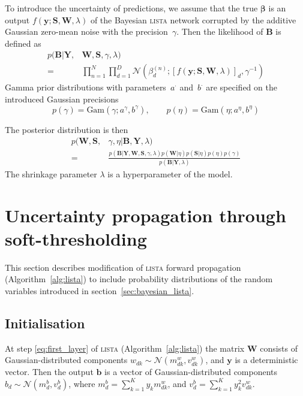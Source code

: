 \documentclass{article}
\begin{document}
  To introduce the uncertainty of predictions, we assume that the true $\boldsymbol\beta$ is an output $f(\mathbf{y} ; \mathbf{S}, \mathbf{W}, \lambda)$ of the Bayesian \textsc{lista} network corrupted by the additive Gaussian zero-mean noise with the precision~$\gamma$. Then the likelihood of $\mathbf{B}$ is defined as
  \begin{equation}
  \label{eq:likelihood}
  \begin{split}
  p(\mathbf{B}| \mathbf{Y}, &\mathbf{W}, \mathbf{S}, \gamma, \lambda) \\
  = &\prod_{n=1}^N\prod_{d=1}^D\mathcal{N}\left(\beta_d^{(n)}; [f(\mathbf{y} ; \mathbf{S}, \mathbf{W}, \lambda)]_d, \gamma^{-1}\right)
 \end{split}
  \end{equation}
  Gamma prior distributions with parameters~$a^{\cdot}$ and~$b^{\cdot}$ are specified on the introduced Gaussian precisions
  \begin{equation}
  \label{eq:gamma_eta}
  p(\gamma) = \text{Gam}\left(\gamma; a^{\gamma}, b^{\gamma}\right), \qquad
  p(\eta) = \text{Gam}\left(\eta; 	a^{\eta}, b^{\eta}\right)
  \end{equation}
  
  The posterior distribution is then
  \begin{equation}
  \label{eq:posterior}
  \begin{split}
  p(\mathbf{W}, \mathbf{S}, &\gamma, \eta | \mathbf{B}, \mathbf{Y}, \lambda) \\
  = &\frac{p(\mathbf{B} | \mathbf{Y}, \mathbf{W},  \mathbf{S}, \gamma, \lambda) p(\mathbf{W} | \eta )p(\mathbf{S} | \eta) p(\eta) p(\gamma)}{p(\mathbf{B} | \mathbf{Y}, \lambda)}
  \end{split}
  \end{equation}
  The shrinkage parameter $\lambda$ is a hyperparameter of the model.
  
  \section{Uncertainty propagation through soft-thresholding}
  \label{sec:fprop}
  This section describes modification of \textsc{lista} forward propagation (Algorithm~\ref{alg:lista}) to include probability distributions of the random variables introduced in section~\ref{sec:bayesian_lista}. 
  
  \subsection{Initialisation}
  \label{subsec:forward_init}
  At step \ref{eq:first_layer} of \textsc{lista} (Algorithm~\ref{alg:lista}) the matrix $\mathbf{W}$ consists of Gaussian-distributed components $w_{dk} \sim \mathcal{N}(m^w_{dk}, v^w_{dk})$, and $\mathbf{y}$ is a deterministic vector. Then the output $\mathbf{b}$ is a vector of Gaussian-distributed components $b_d \sim \mathcal{N}(m^b_d, v^b_d)$, where $m^b_d = \sum_{k=1}^Ky_k m^w_{dk}$, and $v^b_d = \sum_{k=1}^Ky_k^2v^w_{dk}$.
  
\end{document}
